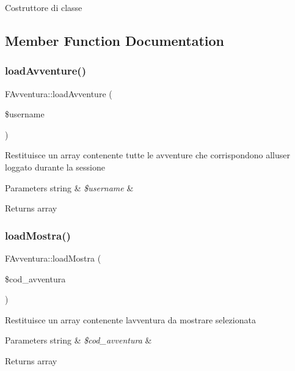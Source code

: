 Costruttore di classe 

\subsection{Member Function Documentation}
\mbox{\label{class_f_avventura_a11b7c09eb9588c5aa5b3fb9c7a69855a}} 
\subsubsection{\texorpdfstring{load\+Avventure()}{loadAvventure()}}
{\footnotesize\ttfamily F\+Avventura\+::load\+Avventure (\begin{DoxyParamCaption}\item[{}]{\$username }\end{DoxyParamCaption})}

Restituisce un array contenente tutte le avventure che corrispondono all\textquotesingle{}user loggato durante la sessione


\begin{DoxyParams}[1]{Parameters}
string & {\em \$username} & \\
\hline
\end{DoxyParams}
\begin{DoxyReturn}{Returns}
array 
\end{DoxyReturn}
\mbox{\label{class_f_avventura_aa73d72dc5bb5840a03b850e208ad4568}} 
\subsubsection{\texorpdfstring{load\+Mostra()}{loadMostra()}}
{\footnotesize\ttfamily F\+Avventura\+::load\+Mostra (\begin{DoxyParamCaption}\item[{}]{\$cod\+\_\+avventura }\end{DoxyParamCaption})}

Restituisce un array contenente l\textquotesingle{}avventura da mostrare selezionata


\begin{DoxyParams}[1]{Parameters}
string & {\em \$cod\+\_\+avventura} & \\
\hline
\end{DoxyParams}
\begin{DoxyReturn}{Returns}
array 
\end{DoxyReturn}
\mbox{\label{class_f_avventura_a12a0c627090bf099850b89ab6b515e3a}} 
